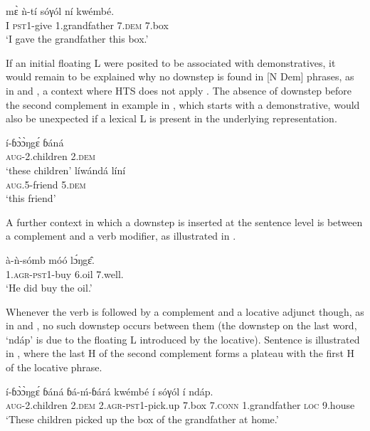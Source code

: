 \documentclass[output=paper,newtxmath,modfonts,nonflat,hidelinks]{langsci/langscibook}
\begin{document}
\ea \gll  m\`ɛ ǹ-tí sóγól ní {\textdownstep}kwémbé.\\
I \textsc{pst1}-give 1.grandfather 7.\textsc{dem} 7.box\\
\glt `I gave the grandfather this box.'\label{ex:HamlaouiMakasso:12}
\z

\noindent If an initial floating L  were posited to be associated with demonstratives, it would remain to be explained why no downstep is found in [N Dem] phrases, as in  and  \citep[273]{Hyman03}, a context where HTS does not apply \citep[28]{HamlaouiEtAl14}. The absence of downstep before the second complement in example  in , which starts with a demonstrative, would also be unexpected if a lexical L  is present in the underlying representation.

\ea \label{ex:HamlaouiMakasso:13}
 \gll í-ɓ\`ɔ\`ɔŋg\'ɛ ɓ{á}n{á}\\
\textsc{aug}-2.children 2.\textsc{dem}\\
\glt `these children'
\ex \gll lí{\textdownstep}w{á}nd{á} líní\\
\textsc{aug}.5-friend 5.\textsc{dem}\\
\glt `this friend'\label{ex:HamlaouiMakasso:13b}
\z

A further context in which a downstep is inserted at the sentence level is between a complement and a verb modifier, as illustrated in .

\ea \gll à-ǹ-sómb móó {\textdownstep}l\'ɔŋg\^ɛ.\\
1.\textsc{agr}-\textsc{pst1}-buy 6.oil 7.well.\\
\glt `He did buy the oil.'\label{ex:HamlaouiMakasso:14}
\z

Whenever the verb is followed by a complement and a locative adjunct though, as in  and , no such downstep occurs between them (the downstep on the last word, `nd{á}p' is due to the floating L introduced by the locative). Sentence  is illustrated in , where the last H  of the second complement forms a plateau with the first H  of the locative phrase.

\ea  \gll í-ɓ\`ɔ\`ɔŋg\'ɛ ɓ{á}n{á} ɓ{á}-\'m-ɓ{á}r{á} kwémbé í sóγól í {\textdownstep}nd{á}p.\\
\textsc{aug}-2.children 2.\textsc{dem} 2.\textsc{agr}-\textsc{pst1}-pick.up 7.box 7.\textsc{conn} 1.grandfather \textsc{loc} 9.house\\
\glt `These children picked up the box of the grandfather at home.'\label{ex:HamlaouiMakasso:15}
\z
\end{document}
